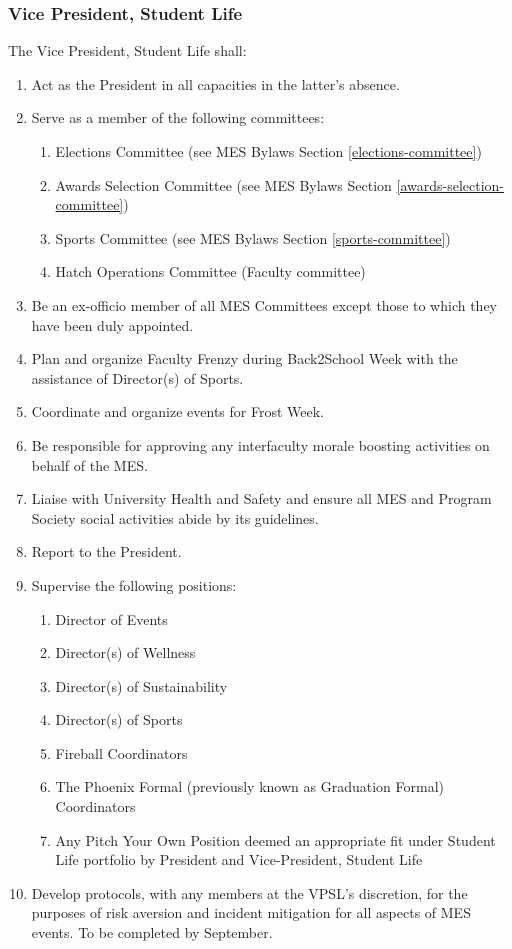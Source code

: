 \subsubsection{Vice President, Student
 Life}
\label{vice-president-student-life}
The Vice President, Student Life shall:

\begin{enumerate}
 \item
  Act as the President in all capacities in the latter's absence.
 \item
  Serve as a member of the following committees:

  \begin{enumerate}
   \item
    Elections Committee (see MES Bylaws Section \ref{elections-committee})
   \item
    Awards Selection Committee (see MES Bylaws Section \ref{awards-selection-committee})
   \item
    Sports Committee (see MES Bylaws Section \ref{sports-committee})
   \item
    Hatch Operations Committee (Faculty committee)
  \end{enumerate}
 \item
  Be an ex-officio member of all MES Committees except those to which they have been duly appointed.
 \item
 Plan and organize Faculty Frenzy during Back2School Week with the assistance of Director(s) of Sports. 
 \item
  Coordinate and organize events for Frost Week.
 \item
  Be responsible for approving any interfaculty morale boosting activities on behalf of the MES.
 \item
  Liaise with University Health and Safety and ensure all MES and Program Society social activities abide by its guidelines.
 \item
  Report to the President.
 \item
  Supervise the following positions:

  \begin{enumerate}
   \item
    Director of Events
   \item
    Director(s) of Wellness
   \item
    Director(s) of Sustainability   
   \item
    Director(s) of Sports    
   \item
    Fireball Coordinators 
   \item   
    The Phoenix Formal (previously known as Graduation Formal) Coordinators   
   \item    
    Any Pitch Your Own Position deemed an appropriate fit under Student Life portfolio by President and Vice-President, Student Life 
  \end{enumerate}
 \item
  Develop protocols, with any members at the VPSL's discretion, for the purposes of risk aversion and incident mitigation for all aspects of MES events. To be completed by September.

\end{enumerate}